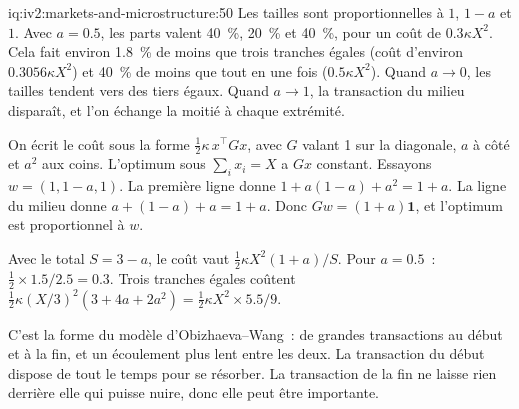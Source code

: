 \begin{solution}{iq:iv2:markets-and-microstructure:50}
Les tailles sont proportionnelles à $1$, $1 - a$ et $1$. Avec $a = 0.5$, les parts valent 40~\%, 20~\% et 40~\%, pour un coût de $0.3\kappa X^2$. Cela fait environ 1.8~\% de moins que trois tranches égales (coût d'environ $0.3056\kappa X^2$) et 40~\% de moins que tout en une fois ($0.5\kappa X^2$). Quand $a \to 0$, les tailles tendent vers des tiers égaux. Quand $a \to 1$, la transaction du milieu disparaît, et l'on échange la moitié à chaque extrémité.

On écrit le coût sous la forme $\tfrac12\kappa\,x^\top Gx$, avec $G$ valant 1 sur la diagonale, $a$ à côté et $a^2$ aux coins. L'optimum sous $\sum_i x_i = X$ a $Gx$ constant. Essayons $w = (1, 1 - a, 1)$. La première ligne donne $1 + a(1 - a) + a^2 = 1 + a$. La ligne du milieu donne $a + (1 - a) + a = 1 + a$. Donc $Gw = (1 + a)\mathbf 1$, et l'optimum est proportionnel à $w$.

Avec le total $S = 3 - a$, le coût vaut $\tfrac12\kappa X^2(1 + a)/S$. Pour $a = 0.5$~: $\tfrac12 \times 1.5/2.5 = 0.3$. Trois tranches égales coûtent $\tfrac12\kappa(X/3)^2(3 + 4a + 2a^2) = \tfrac12\kappa X^2 \times 5.5/9$.

C'est la forme du modèle d'Obizhaeva--Wang~: de grandes transactions au début et à la fin, et un écoulement plus lent entre les deux. La transaction du début dispose de tout le temps pour se résorber. La transaction de la fin ne laisse rien derrière elle qui puisse nuire, donc elle peut être importante.

\end{solution}
